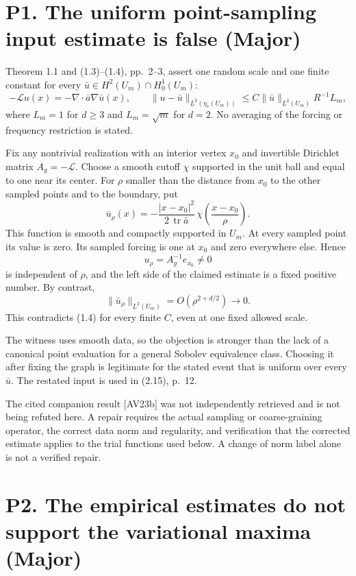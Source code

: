\documentclass[10pt]{article}
\begin{document}
\section*{P1. The uniform point-sampling input estimate is false (Major)}
Theorem 1.1 and (1.3)–(1.4), pp. 2–3, assert one random scale and one finite constant for every \(\bar u\in H^2(U_m)\cap H_0^1(U_m)\): \[-\mathcal Lu(x)=-\nabla\cdot\bar a\nabla\bar u(x),
 \qquad
 \|u-\bar u\|_{\underline L^2(\eta_*(U_m))}
 \leq C\|\bar u\|_{\underline L^2(U_m)}R^{-1}L_m,\] where \(L_m=1\) for \(d\geq3\) and \(L_m=\sqrt m\) for \(d=2\). No averaging of the forcing or frequency restriction is stated.\par
Fix any nontrivial realization with an interior vertex \(x_0\) and invertible Dirichlet matrix \(A_g=-\mathcal L\). Choose a smooth cutoff \(\chi\) supported in the unit ball and equal to one near its center. For \(\rho\) smaller than the distance from \(x_0\) to the other sampled points and to the boundary, put \[\bar u_\rho(x)=
 -\frac{|x-x_0|^2}{2\,\operatorname{tr}\bar a}\,
 \chi\!\left(\frac{x-x_0}{\rho}\right).\] This function is smooth and compactly supported in \(U_m\). At every sampled point its value is zero. Its sampled forcing is one at \(x_0\) and zero everywhere else. Hence \[u_\rho=A_g^{-1}e_{x_0}\ne0\] is independent of \(\rho\), and the left side of the claimed estimate is a fixed positive number. By contrast, \[\|\bar u_\rho\|_{\underline L^2(U_m)}
 =O(\rho^{2+d/2})\longrightarrow0.\] This contradicts (1.4) for every finite \(C\), even at one fixed allowed scale.\par
The witness uses smooth data, so the objection is stronger than the lack of a canonical point evaluation for a general Sobolev equivalence class. Choosing it after fixing the graph is legitimate for the stated event that is uniform over every \(\bar u\). The restated input is used in (2.15), p. 12.\par
The cited companion result [AV23b] was not independently retrieved and is not being refuted here. A repair requires the actual sampling or coarse-graining operator, the correct data norm and regularity, and verification that the corrected estimate applies to the trial functions used below. A change of norm label alone is not a verified repair.\par
\section*{P2. The empirical estimates do not support the variational maxima (Major)}
\end{document}
